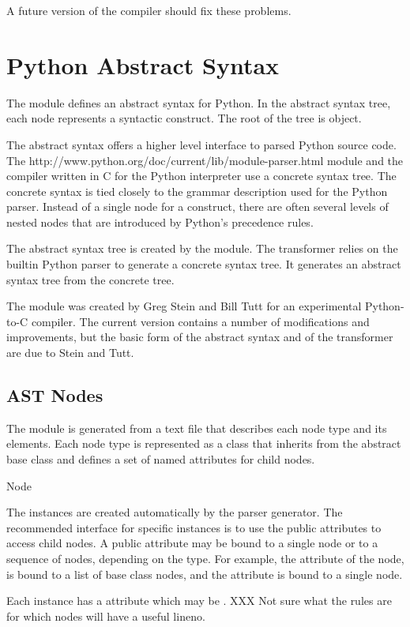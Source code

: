 A future version of the compiler should fix these problems.

\section{Python Abstract Syntax}

The  module defines an abstract syntax for
Python.  In the abstract syntax tree, each node represents a syntactic
construct.  The root of the tree is  object.

The abstract syntax offers a higher level interface to parsed Python
source code.  The 
{http://www.python.org/doc/current/lib/module-parser.html}
module and the compiler written in C for the Python interpreter use a
concrete syntax tree.  The concrete syntax is tied closely to the
grammar description used for the Python parser.  Instead of a single
node for a construct, there are often several levels of nested nodes
that are introduced by Python's precedence rules.

The abstract syntax tree is created by the
 module.  The transformer relies on the
builtin Python parser to generate a concrete syntax tree.  It
generates an abstract syntax tree from the concrete tree.  

The  module was created by Greg
Stein and Bill Tutt for an
experimental Python-to-C compiler.  The current version contains a
number of modifications and improvements, but the basic form of the
abstract syntax and of the transformer are due to Stein and Tutt.

\subsection{AST Nodes}


The  module is generated from a text file that
describes each node type and its elements.  Each node type is
represented as a class that inherits from the abstract base class
 and defines a set of named attributes for
child nodes.

\begin{classdesc}{Node}{}
  
  The  instances are created automatically by the parser
  generator.  The recommended interface for specific 
  instances is to use the public attributes to access child nodes.  A
  public attribute may be bound to a single node or to a sequence of
  nodes, depending on the  type.  For example, the
   attribute of the  node, is bound to a
  list of base class nodes, and the  attribute is bound to
  a single node.
  
  Each  instance has a  attribute which may
  be .  XXX Not sure what the rules are for which nodes
  will have a useful lineno.
\end{classdesc}

